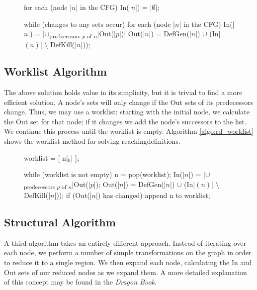 \documentclass[bsc,twoside,singlespacing,parskip,logo,notimes,normalheadings]{infthesis}
\begin{document}
        \begin{figure}[h]
          \begin{algorithm}[caption={Iterative Round-Robin Method for Reaching Definitions}, label={algo:rd_iterative},escapeinside={||},mathescape=true]
for each (node |$n$| in the CFG)
    In(|$n$|) = |$\emptyset$|;

while (changes to any sets occur)
    for each (node |$n$| in the CFG)
        In(|$n$|)  = |$\cup$\textsubscript{predecessors $p$ of $n$}|Out(|$p$|);
        Out(|$n$|) = DefGen(|$n$|) $\cup$ (In|$(n)$| $\setminus$ DefKill(|$n$|));
          \end{algorithm}
        \end{figure}

        \subsection{Worklist Algorithm}
        The above solution holds value in its simplicity, but it is
        trivial to find a more efficient solution. A node's sets will
        only change if the Out sets of its predecessors change. Thus,
        we may use a worklist: starting with the initial node, we
        calculate the Out set for that node; if it changes we add the
        node's successors to the list. We continue this process until
        the worklist is empty. Algorithm \ref{algo:rd_worklist} shows
        the worklist method for solving \gls{reachingdefinition}s.

        \begin{figure}[h]
          \begin{algorithm}[caption={Worklist  Method for Reaching Definitions}, label={algo:rd_worklist},escapeinside={||},mathescape=true]
worklist = [ n|$_{0}$| ];

while (worklist is not empty)
    n = pop(worklist);
    In(|$n$|)  = |$\cup$\textsubscript{predecessors $p$ of $n$}|Out(|$p$|);
    Out(|$n$|) = DefGen(|$n$|) $\cup$ (In|$(n)$| $\setminus$ DefKill(|$n$|));
    if (Out(|$n$|) has changed) append n to worklist;
          \end{algorithm}
        \end{figure}

        \subsection{Structural Algorithm}
        A third algorithm takes an entirely different
        approach. Instead of iterating over each node, we perform a
        number of simple transformations on the graph in order to
        reduce it to a single \gls{region}. We then expand each node,
        calculating the In and Out sets of our reduced nodes as we
        expand them. A more detailed explanation of this concept may
        be found in the {\em Dragon Book}\cite[p. 673]{dragonbook}.
\end{document}
